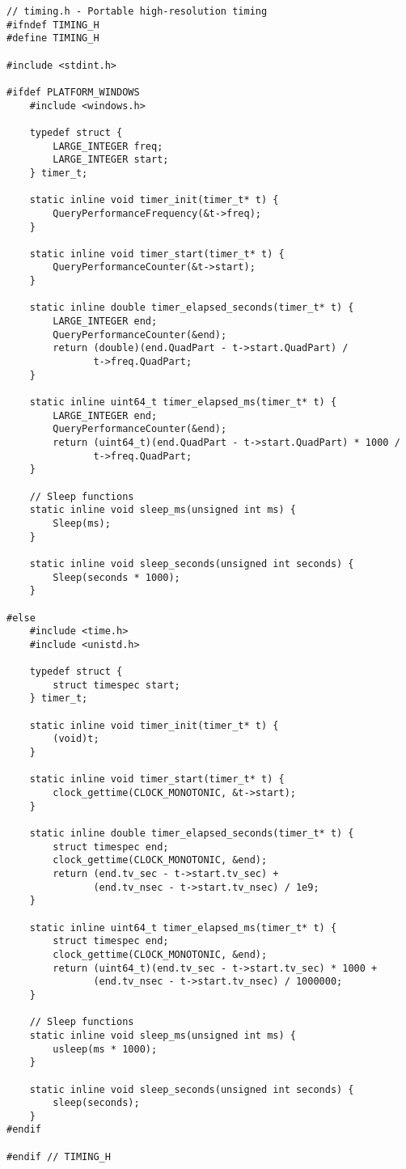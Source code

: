 \begin{lstlisting}
// timing.h - Portable high-resolution timing
#ifndef TIMING_H
#define TIMING_H

#include <stdint.h>

#ifdef PLATFORM_WINDOWS
    #include <windows.h>

    typedef struct {
        LARGE_INTEGER freq;
        LARGE_INTEGER start;
    } timer_t;

    static inline void timer_init(timer_t* t) {
        QueryPerformanceFrequency(&t->freq);
    }

    static inline void timer_start(timer_t* t) {
        QueryPerformanceCounter(&t->start);
    }

    static inline double timer_elapsed_seconds(timer_t* t) {
        LARGE_INTEGER end;
        QueryPerformanceCounter(&end);
        return (double)(end.QuadPart - t->start.QuadPart) /
               t->freq.QuadPart;
    }

    static inline uint64_t timer_elapsed_ms(timer_t* t) {
        LARGE_INTEGER end;
        QueryPerformanceCounter(&end);
        return (uint64_t)(end.QuadPart - t->start.QuadPart) * 1000 /
               t->freq.QuadPart;
    }

    // Sleep functions
    static inline void sleep_ms(unsigned int ms) {
        Sleep(ms);
    }

    static inline void sleep_seconds(unsigned int seconds) {
        Sleep(seconds * 1000);
    }

#else
    #include <time.h>
    #include <unistd.h>

    typedef struct {
        struct timespec start;
    } timer_t;

    static inline void timer_init(timer_t* t) {
        (void)t;
    }

    static inline void timer_start(timer_t* t) {
        clock_gettime(CLOCK_MONOTONIC, &t->start);
    }

    static inline double timer_elapsed_seconds(timer_t* t) {
        struct timespec end;
        clock_gettime(CLOCK_MONOTONIC, &end);
        return (end.tv_sec - t->start.tv_sec) +
               (end.tv_nsec - t->start.tv_nsec) / 1e9;
    }

    static inline uint64_t timer_elapsed_ms(timer_t* t) {
        struct timespec end;
        clock_gettime(CLOCK_MONOTONIC, &end);
        return (uint64_t)(end.tv_sec - t->start.tv_sec) * 1000 +
               (end.tv_nsec - t->start.tv_nsec) / 1000000;
    }

    // Sleep functions
    static inline void sleep_ms(unsigned int ms) {
        usleep(ms * 1000);
    }

    static inline void sleep_seconds(unsigned int seconds) {
        sleep(seconds);
    }
#endif

#endif // TIMING_H
\end{lstlisting}

